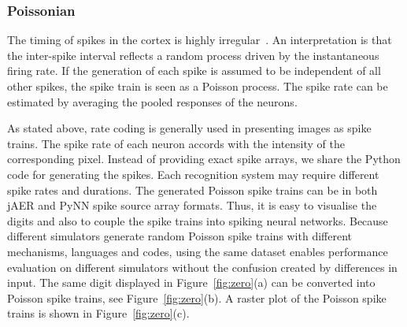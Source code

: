 \subsubsection{Poissonian}
\label{sec:poissonian}
The timing of spikes in the cortex is highly irregular~\citep{squire1998findings}.
An interpretation is that the inter-spike interval reflects a random process driven by the instantaneous firing rate.
If the generation of each spike is assumed to be independent of all other spikes, the spike train is seen as a Poisson process.
The spike rate can be estimated by averaging the pooled responses of the neurons.


As stated above, rate coding is generally used in presenting images as spike trains.
The spike rate of each neuron accords with the intensity of the corresponding pixel.
Instead of providing exact spike arrays, we share the Python code for generating the spikes.
Each recognition system may require different spike rates and durations.
The generated Poisson spike trains can be in both jAER and PyNN spike source array formats.
Thus, it is easy to visualise the digits and also to couple the spike trains into spiking neural networks.
Because different simulators generate random Poisson spike trains with different mechanisms, languages and codes, using the same dataset enables performance evaluation on different simulators without the confusion created by differences in input.
The same digit displayed in Figure~\ref{fig:zero}(a) can be converted into Poisson spike trains, see Figure~\ref{fig:zero}(b).
A raster plot of the Poisson spike trains is shown in Figure~\ref{fig:zero}(c).



